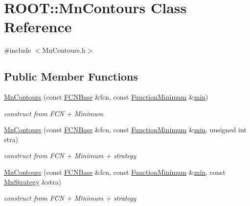 \hypertarget{classROOT_1_1Minuit2_1_1MnContours}{}\section{R\+O\+OT\+:\+:Mn\+Contours Class Reference}
\label{classROOT_1_1Minuit2_1_1MnContours}


{\ttfamily \#include $<$Mn\+Contours.\+h$>$}

\subsection*{Public Member Functions}
\begin{DoxyCompactItemize}
\item 
\mbox{\hyperlink{classROOT_1_1Minuit2_1_1MnContours_a87d983509ac3ce6f6635407a81e07153}{Mn\+Contours}} (const \mbox{\hyperlink{classROOT_1_1Minuit2_1_1FCNBase}{F\+C\+N\+Base}} \&fcn, const \mbox{\hyperlink{classROOT_1_1Minuit2_1_1FunctionMinimum}{Function\+Minimum}} \&\mbox{\hyperlink{SU3__internal_8h_ab0f5fed3171eb00d1c5f037d9f518a23}{min}})
\begin{DoxyCompactList}\small\item\em construct from F\+CN + Minimum \end{DoxyCompactList}\item 
\mbox{\hyperlink{classROOT_1_1Minuit2_1_1MnContours_af56ce1293967140b9ee0ea0b30fad690}{Mn\+Contours}} (const \mbox{\hyperlink{classROOT_1_1Minuit2_1_1FCNBase}{F\+C\+N\+Base}} \&fcn, const \mbox{\hyperlink{classROOT_1_1Minuit2_1_1FunctionMinimum}{Function\+Minimum}} \&\mbox{\hyperlink{SU3__internal_8h_ab0f5fed3171eb00d1c5f037d9f518a23}{min}}, unsigned int stra)
\begin{DoxyCompactList}\small\item\em construct from F\+CN + Minimum + strategy \end{DoxyCompactList}\item 
\mbox{\hyperlink{classROOT_1_1Minuit2_1_1MnContours_a8f75794bb66e605caabac79cf7a32c77}{Mn\+Contours}} (const \mbox{\hyperlink{classROOT_1_1Minuit2_1_1FCNBase}{F\+C\+N\+Base}} \&fcn, const \mbox{\hyperlink{classROOT_1_1Minuit2_1_1FunctionMinimum}{Function\+Minimum}} \&\mbox{\hyperlink{SU3__internal_8h_ab0f5fed3171eb00d1c5f037d9f518a23}{min}}, const \mbox{\hyperlink{classROOT_1_1Minuit2_1_1MnStrategy}{Mn\+Strategy}} \&stra)
\begin{DoxyCompactList}\small\item\em construct from F\+CN + Minimum + strategy \end{DoxyCompactList}\item 

\end{DoxyCompactItemize}
